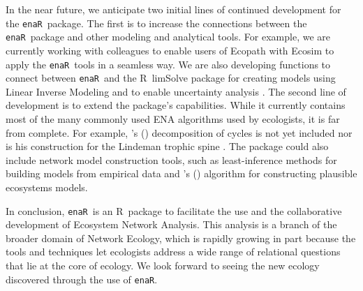 \documentclass[11pt]{article}
\def\citeapos#1{\citeauthor{#1}'s (\citeyear{#1})}
\newcommand{\R}{R}
\newcommand{\enaR}{\texttt{enaR}}
\begin{document}
\begin{spacing}{2}
In the near future, we anticipate two initial lines of continued
development for the \enaR\ package. The first is to increase the
connections between the \enaR\ package and other modeling and
analytical tools.  For example, we are currently working with
colleagues to enable users of Ecopath with Ecosim
\citep{christensen04} to apply the \enaR\ tools in a seamless way.  We
are also developing functions to connect between \enaR\ and the \R\
limSolve package \citep{soetaert09} for creating models using Linear
Inverse Modeling and to enable uncertainty analysis
\citep{kones09}. The second line of development is to extend the
package's capabilities.  While it currently contains most of the many
commonly used ENA algorithms used by ecologists, it is far from
complete. For example, \citeapos{ulanowicz83} decomposition of cycles
is not yet included nor is his construction for the Lindeman trophic
spine \citep{ulanowicz1979trophic}. The package could also include
network model construction tools, such as least-inference methods for
building models from empirical data \citep{ulanowicz2008least} and
\citeapos{fath04_cyber} algorithm for constructing plausible
ecosystems models.

In conclusion, \enaR\ is an \R\ package to facilitate the use and the
collaborative development of Ecosystem Network Analysis.  This
analysis is a branch of the broader domain of Network Ecology, which
is rapidly growing in part because the tools and techniques let
ecologists address a wide range of relational questions that lie at
the core of ecology.  We look forward to seeing the new ecology
discovered through the use of \enaR . 






\end{spacing}
\end{document}
